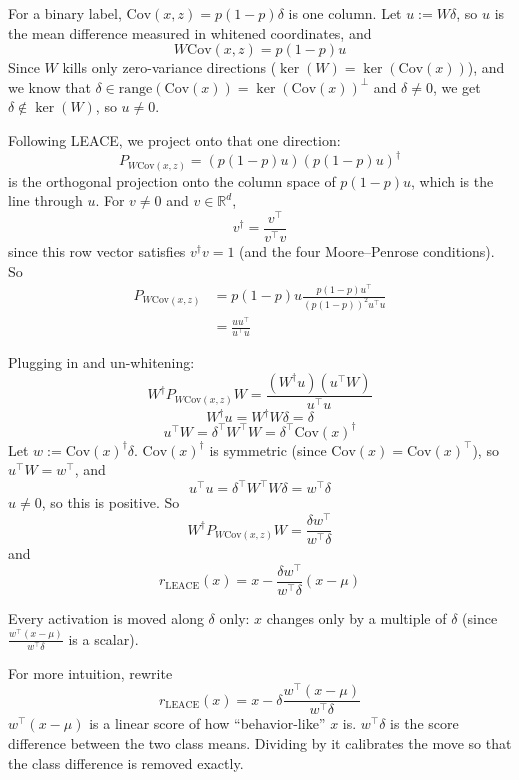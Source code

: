 \documentclass[10pt,a4paper,twocolumn]{article}
\newcommand{\R}{\mathbb{R}}
\begin{document}
	For a binary label, $\mathrm{Cov}(x, z) = p (1 - p) \delta$ is one column. Let $u := W \delta$, so $u$ is the mean difference measured in whitened coordinates, and
	$$W \mathrm{Cov}(x, z) = p (1 - p) u$$
	Since $W$ kills only zero-variance directions ($\ker(W) = \ker(\mathrm{Cov}(x))$), and we know that $\delta \in \mathrm{range}(\mathrm{Cov}(x)) = \ker(\mathrm{Cov}(x))^\perp$ and $\delta \ne 0$, we get $\delta \notin \ker(W)$, so $u \ne 0$.

	Following LEACE, we project onto that one direction:
	$$P_{W \mathrm{Cov}(x, z)} = (p (1 - p) u) (p (1 - p) u)^\dagger$$
	is the orthogonal projection onto the column space of $p (1 - p) u$, which is the line through $u$. For $v \ne 0$ and $v \in \R^d$,
	$$v^\dagger = \frac{v^\top}{v^\top v}$$
	since this row vector satisfies $v^\dagger v = 1$ (and the four Moore--Penrose conditions). So
	$$\begin{aligned}
		P_{W \mathrm{Cov}(x, z)} & = p (1 - p) u \frac{p (1 - p) u^\top}{(p (1 - p))^2 u^\top u} \\
		& = \frac{u u^\top}{u^\top u}
	\end{aligned}$$

	Plugging in and un-whitening:
	$$W^\dagger P_{W \mathrm{Cov}(x, z)} W = \frac{(W^\dagger u)(u^\top W)}{u^\top u}$$
	$$W^\dagger u = W^\dagger W \delta = \delta$$
	$$u^\top W = \delta^\top W^\top W = \delta^\top \mathrm{Cov}(x)^\dagger$$
	Let $w := \mathrm{Cov}(x)^\dagger \delta$. $\mathrm{Cov}(x)^\dagger$ is symmetric (since $\mathrm{Cov}(x) = \mathrm{Cov}(x)^\top$), so $u^\top W = w^\top$, and
	$$u^\top u = \delta^\top W^\top W \delta = w^\top \delta$$
	$u \ne 0$, so this is positive. So
	$$W^\dagger P_{W \mathrm{Cov}(x, z)} W = \frac{\delta w^\top}{w^\top \delta}$$
	and
	$$r_{\mathrm{LEACE}}(x) = x - \frac{\delta w^\top}{w^\top \delta} (x - \mu)$$

	Every activation is moved along $\delta$ only: $x$ changes only by a multiple of $\delta$ (since $\frac{w^\top (x - \mu)}{w^\top \delta}$ is a scalar).

	For more intuition, rewrite
	$$r_{\mathrm{LEACE}}(x) = x - \delta \frac{w^\top (x - \mu)}{w^\top \delta}$$
	$w^\top (x - \mu)$ is a linear score of how ``behavior-like'' $x$ is. $w^\top \delta$ is the score difference between the two class means. Dividing by it calibrates the move so that the class difference is removed exactly.
\end{document}
